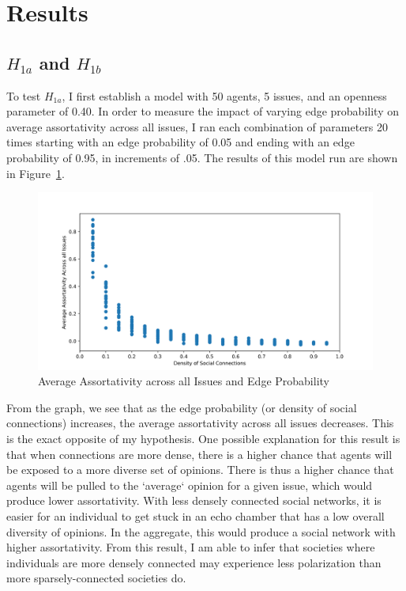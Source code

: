 \section{Results}
\subsection{$H_{1a}$ and $H_{1b}$}

To test $H_{1a}$, I first establish a model with 50 agents, 5 issues, and an
openness parameter of 0.40. In order to measure the impact of varying edge
probability on average assortativity across all issues, I ran each combination
of parameters 20 times starting with an edge probability of 0.05 and ending
with an edge probability of 0.95, in increments of .05. The results of this
model run are shown in Figure~\ref{H1a_plot}.

\begin{figure}
\centering
\includegraphics[width=1.0\columnwidth]{./Graphs/Assort_edge.png}
\caption{Average Assortativity across all Issues and Edge Probability}
\label{H1a_plot}
\end{figure}

From the graph, we see that as the edge probability (or density of social connections)
increases, the average assortativity across all issues decreases. This is the
exact opposite of my hypothesis. One possible explanation for this result is
that when connections are more dense, there is a higher chance that agents will
be exposed to a more diverse set of opinions. There is thus a higher chance
that agents will be pulled to the `average` opinion for a given issue, which
would produce lower assortativity. With less densely connected social networks, it is easier for an individual to get stuck in an echo chamber that has a low overall diversity of opinions. In the aggregate, this would produce a social network with higher assortativity. From this result, I am able to infer
that societies where individuals are more densely connected may experience
less polarization than more sparsely-connected societies do. 

